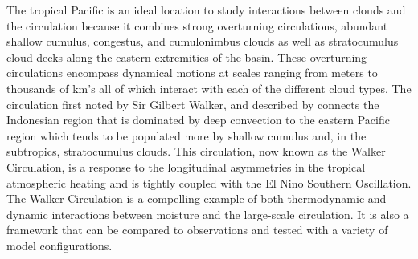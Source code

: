 \documentclass[draft]{agujournal2019}
\begin{document}
The tropical Pacific is an ideal location to study interactions between clouds and the circulation 
because it combines strong overturning circulations, abundant shallow cumulus, congestus, and cumulonimbus 
clouds \cite{Johnson1999} as well as stratocumulus cloud decks along the eastern extremities of the basin.
These overturning circulations encompass dynamical motions at scales
ranging from meters to thousands of km's all of which interact with each of the different cloud types.
The circulation first noted by Sir Gilbert Walker, and described by  connects the 
Indonesian region that is dominated by deep convection to the eastern Pacific region which tends to 
be populated more by shallow cumulus and, in the subtropics, stratocumulus clouds.  
This circulation, now known as the Walker Circulation, is a response to the 
longitudinal asymmetries in the tropical atmospheric heating and is tightly coupled with 
the El Nino Southern Oscillation.    
The Walker Circulation is a compelling example of both thermodynamic and dynamic interactions
between moisture and the large-scale circulation.  It is also a framework that can be compared 
to observations and tested with a variety of model configurations. 

\end{document}
